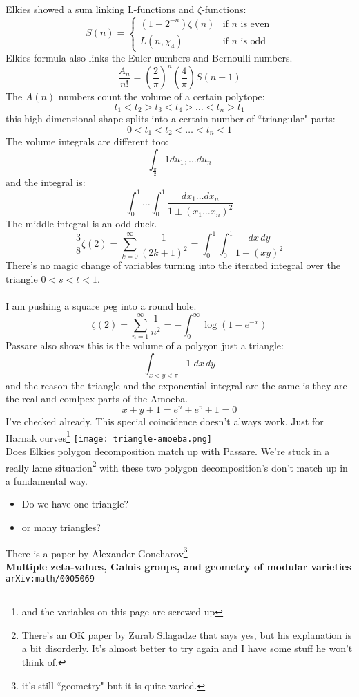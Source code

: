 \documentclass[12pt]{article}
\begin{document}
\newpage

\noindent Elkies showed a sum linking L-functions and $\zeta$-functions:
$$ 
S(n) = \left\{ \begin{array}{cl}
(1-2^{-n})\zeta(n) & \text{if }n\text{ is even} \\
L(n, \chi_4) & \text{if }n\text{ is odd}
\end{array} \right.
 $$
Elkies formula also links the Euler numbers and Bernoulli numbers.
$$ \frac{A_n}{n!} = \left( \frac{2}{\pi} \right)^n \left( \frac{4}{\pi}\right) S(n+1) $$
The $A(n)$ numbers count the volume of a certain polytope:
$$ t_1 < t_2 > t_3 < t_4 > \dots < t_n > t_1 $$
this high-dimensional shape splits into a certain number of ``triangular" parts:
$$ 0 < t_1 < t_2 < \dots < t_n < 1$$
The volume integrals are different too:
$$ \int_{\frac{\pi}{2} } 1 du_1, \dots du_n $$
and the integral is:
$$ \int_0^1 \dots \int_0^1 \frac{dx_1 \dots dx_n}{1 \pm (x_1 \dots x_n)^2} $$
\newpage
\noindent The middle integral is an odd duck. 
$$ \frac{3}{8} \zeta(2)=\sum_{k=0}^\infty \frac{1}{(2k+1)^2} = \int_0^1 \int_0^1 \frac{dx \, dy}{1 - (xy)^2} $$
There's no magic change of variables turning into the iterated integral over the triangle $0 < s < t < 1$. \\ \\ I am pushing a square peg into a round hole.
$$ \zeta(2)  = \sum_{n=1}^\infty \frac{1}{n^2} = - \int_0^\infty \log(1 - e^{-x})$$
Passare also shows this is the volume of a polygon just a triangle:
$$ \int_{ x < y < \pi} 1 \; dx \, dy $$
and the reason the triangle and the exponential integral are the same
is they are the real and comlpex parts of the Amoeba. 
$$ x + y + 1 = e^u + e^v + 1 = 0 $$
I've checked already.  This special coincidence doesn't always work.  Just for Harnak curves\footnote{and the variables on this page are screwed up}
 \newpage
\texttt{[image: triangle-amoeba.png]} \\
Does Elkies polygon decomposition match up with Passare.  We're stuck in a really lame situation\footnote{There's an OK paper by Zurab Silagadze that says yes, but his explanation is a bit disorderly.  It's almost better to try again and I have some stuff he won't think of.} with these two polygon decomposition's don't match up in a fundamental way.
\begin{itemize}
\item Do we have one triangle?
\item or many triangles?
\end{itemize}
There is a paper by Alexander Goncharov\footnote{it's still ``geometry" but it is quite varied.} \\
\textbf{Multiple zeta-values, Galois groups, and geometry of modular varieties}
\texttt{ arXiv:math/0005069}
 \newpage
\end{document}

